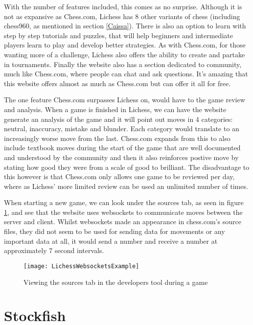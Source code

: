 With the number of features included, this comes as no surprise. Although it is not as expansive as Chess.com, Lichess has 8 other variants of chess (including chess960, as mentioned in section \ref{Caissa}). There is also an option to learn with step by step tutorials and puzzles, that will help beginners and intermediate players learn to play and develop better strategies. As with Chess.com, for those wanting more of a challenge, Lichess also offers the ability to create and partake in tournaments. Finally the website also has a section dedicated to community, much like Chess.com, where people can chat and ask questions. It's amazing that this website offers almost as much as Chess.com but can offer it all for free.

The one feature Chess.com surpasses Lichess on, would have to the game review and analysis. When a game is finished in Lichess, we can have the website generate an analysis of the game and it will point out moves in 4 categories: neutral, inaccuracy, mistake and blunder. Each category would translate to an increasingly worse move from the last. Chess.com expands from this to also include textbook moves during the start of the game that are well documented and understood by the community and then it also reinforces postive move by stating how good they were from a scale of good to brilliant. The disadvantage to this however is that Chess.com only allows one game to be reviewed per day, where as Lichess' more limited review can be used an unlimited number of times.

When starting a new game, we can look under the sources tab, as seen in figure \ref{LichessWebsocketsExample}, and see that the website uses websockets to communicate moves between the server and client. Whilst websockets made an appearance in chess.com's source files, they did not seem to be used for sending data for movements or any important data at all, it would send a number and receive a number at approximately 7 second intervals.

\begin{figure}
    \begin{center}
        \texttt{[image: LichessWebsocketsExample]}
        \caption{Viewing the sources tab in the developers tool during a game}
        \label{LichessWebsocketsExample}
    \end{center}
\end{figure}

\section{Stockfish}

